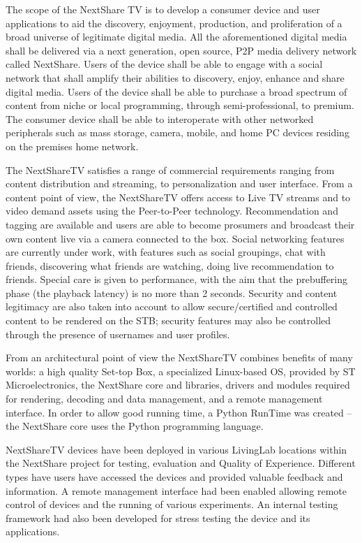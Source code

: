The scope of the NextShare TV is to develop a consumer device and user
applications to aid the discovery, enjoyment, production, and proliferation of
a broad universe of legitimate digital media. All the aforementioned digital
media shall be delivered via a next generation, open source, P2P media
delivery network called NextShare. Users of the device shall be able to engage
with a social network that shall amplify their abilities to discovery, enjoy,
enhance and share digital media. Users of the device shall be able to purchase
a broad spectrum of content from niche or local programming, through
semi-professional, to premium. The consumer device shall be able to
interoperate with other networked peripherals such as mass storage, camera,
mobile, and home PC devices residing on the premises home network.

The NextShareTV satisfies a range of commercial requirements ranging from
content distribution and streaming, to personalization and user interface.
From a content point of view, the NextShareTV offers access to Live TV streams
and to video demand assets using the Peer-to-Peer technology. Recommendation
and tagging are available and users are able to become prosumers and broadcast
their own content live via a camera connected to the box. Social networking
features are currently under work, with features such as social groupings,
chat with friends, discovering what friends are watching, doing live
recommendation to friends. Special care is given to performance, with the aim
that the prebuffering phase (the playback latency) is no more than 2 seconds.
Security and content legitimacy are also taken into account to allow
secure/certified and controlled content to be rendered on the STB; security
features may also be controlled through the presence of usernames and user
profiles.

From an architectural point of view the NextShareTV combines benefits of many
worlds: a high quality Set-top Box, a specialized Linux-based OS, provided by
ST Microelectronics, the NextShare core and libraries, drivers and modules
required for rendering, decoding and data management, and a remote management
interface. In order to allow good running time, a Python RunTime was created
-- the NextShare core uses the Python programming language.

NextShareTV devices have been deployed in various LivingLab locations within
the NextShare project for testing, evaluation and Quality of Experience.
Different types have users have accessed the devices and provided valuable
feedback and information. A remote management interface had been enabled
allowing remote control of devices and the running of various experiments. An
internal testing framework had also been developed for stress testing the
device and its applications.


